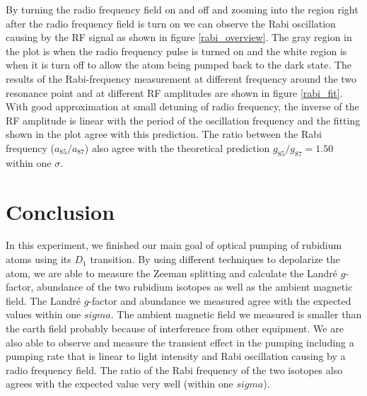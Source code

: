 \documentclass[aps,twocolumn,secnumarabic,balancelastpage,amsmath,amssymb,nofootinbib]{revtex4}
\begin{document}
By turning the radio frequency field on and off and zooming into the region right after the radio frequency field is turn on we can observe the Rabi oscillation causing by the RF signal as shown in figure \ref{rabi_overview}. The gray region in the plot is when the radio frequency pulse is turned on and the white region is when it is turn off to allow the atom being pumped back to the dark state. The results of the Rabi-frequency measurement at different frequency around the two resonance point and at different RF amplitudes are shown in figure \ref{rabi_fit}. With good approximation at small detuning of radio frequency, the inverse of the RF amplitude is linear with the period of the oscillation frequency and the fitting shown in the plot agree with this prediction. The ratio between the Rabi frequency ($a_{85}/a_{87}$) also agree with the theoretical prediction $g_{85}/g_{87}=1.50$ within one $\sigma$.

\section{Conclusion}
In this experiment, we finished our main goal of optical pumping of rubidium atoms using its $D_1$ transition. By using different techniques to depolarize the atom, we are able to measure the Zeeman splitting and calculate the Landr\'e $g$-factor, abundance of the two rubidium isotopes as well as the ambient magnetic field. The Landr\'e $g$-factor and abundance we measured agree with the expected values within one $sigma$. The ambient magnetic field we measured is smaller than the earth field probably because of interference from other equipment. We are also able to observe and measure the transient effect in the pumping including a pumping rate that is linear to light intensity and Rabi oscillation causing by a radio frequency field. The ratio of the Rabi frequency of the two isotopes also agrees with the expected value very well (within one $sigma$).


\end{document}
